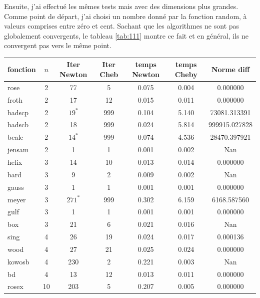 Ensuite, j'ai effectu\'e les mêmes tests mais avec des dimensions plus grandes. Comme point de d\'epart,
j'ai choisi un nombre donn\'e par la fonction random, \`a valeurs comprises entre z\'ero et cent. Sachant que les algorithmes ne sont pas 
globalement convergents, le tableau \ref{tab:111} montre ce fait et en g\'en\'eral, ils ne convergent pas vers le même point.





\begin{table}%
	\begin{center}
{\small
\begin{tabular}{|l|c|c|c|c|c|c|}
  \hline fonction & $n$ & Iter Newton & Iter Cheb & temps Newton & temps Cheby & Norme diff \\
 \hline
   rose& 2 & 77 & 5 & 0.075 & 0.004 & 0.000000 \\\hline
   froth& 2 & 17 & 12 & 0.015 & 0.011 & 0.000000 \\\hline
   badscp& 2 & $19^*$ & 999 & 0.104 & 5.140 & 73081.313391 \\\hline
   badscb& 2 & 18 & 999 & 0.024 & 5.814 & 999915.027828 \\\hline
   beale& 2 & $14^*$ & 999 & 0.074 & 4.536 & 28470.397921 \\\hline
   jensam& 2 & 1 & 1 & 0.001 & 0.002 & Nan \\\hline
   helix& 3 & 14 & 10 & 0.013 & 0.014 & 0.000000 \\\hline
   bard& 3 & 9 & 2 & 0.009 & 0.002 & Nan \\\hline
   gauss& 3 & 1 & 1 & 0.001 & 0.001 & 0.000000 \\\hline
   meyer& 3 & $271^*$ & 999 & 0.302 & 6.159 & 6168.587560 \\\hline
   gulf& 3 & 1 & 1 & 0.001 & 0.001 & 0.000000 \\\hline
   box& 3 & 21 & 6 & 0.021 & 0.016 & Nan \\\hline
   sing& 4 & 26 & 19 & 0.024 & 0.017 & 0.000136 \\\hline
   wood& 4 & 27 & 21 & 0.025 & 0.024 & 0.000000 \\\hline
   kowosb& 4 & 230 & 2 & 0.221 & 0.003 & Nan \\\hline
   bd& 4 & 13 & 12 & 0.013 & 0.011 & 0.000000 \\\hline
   rosex& 10 & 203 & 5 & 0.207 & 0.005 & 0.000000 \\\hline

\end{tabular}}
\end{center}
\end{table}
